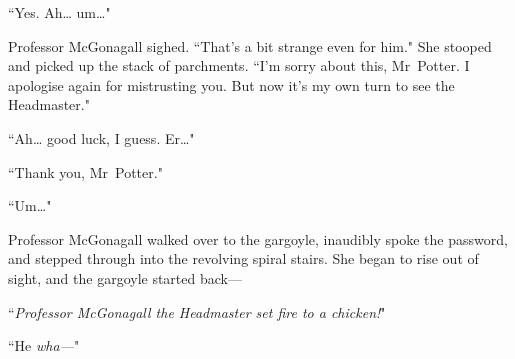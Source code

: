 ``Yes. Ah{\ldots} um{\ldots}"

Professor McGonagall sighed. ``That's a bit strange even for him." She stooped and picked up the stack of parchments. ``I'm sorry about this, Mr~Potter. I apologise again for mistrusting you. But now it's my own turn to see the Headmaster."

``Ah{\ldots} good luck, I guess. Er{\ldots}"

``Thank you, Mr~Potter."

``Um{\ldots}"

Professor McGonagall walked over to the gargoyle, inaudibly spoke the password, and stepped through into the revolving spiral stairs. She began to rise out of sight, and the gargoyle started back—

``\emph{Professor McGonagall the Headmaster set fire to a chicken!}"

``He \emph{wha—}"

